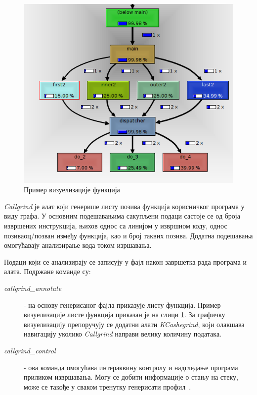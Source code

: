 \documentclass[12pt,oneside]{memoir}
\begin{document}
\begin{figure}[h!]
\begin{center}
\includegraphics[scale=0.75]{slika18.png}
\end{center}
\caption{Пример визуелизације функција}
\label{fig:callgrind}
\end{figure}

\indent \textit{Callgrind} је алат који генерише листу позива функција корисничког програма у виду графа. У основним подешавањима сакупљени подаци састоје се од броја извршених инструкција, њихов однос са линијом у извршном коду, однос позиваоц/позван између функција, као и број таквих позива. Додатна подешавања омогућавају анализирање кода током изршавања. 

\indent Подаци који се анализирају се записују у фајл након завршетка рада програма и алата. Подржане команде су:

\begin{description}
	\item[\textit{callgrind\_annotate}] - на основу генерисаног фајла приказује листу функција. Пример визуелизације листе функција приказан је на слици \ref{fig:callgrind}. За графичку визуелизацију препоручују се додатни алати \textit{KCashegrind}, који олакшава навигацију уколико \textit{Callgrind} направи велику количину података.
	\item[\textit{callgrind\_control}] - ова команда омогућава интераквину контролу и надгледање програма приликом извршавања. Могу се добити информације о стању на стеку, може се такође у сваком тренутку генерисати профил~\cite{callgrindRef}.
\end{description}
\end{document}
